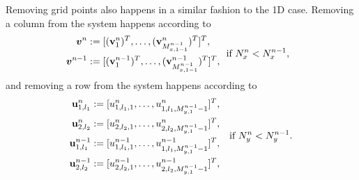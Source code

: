 \documentclass[fleqn]{jaes}
\begin{document}
Removing grid points also happens in a similar fashion to the 1D case. Removing a column from the system happens according to 
\begin{equation}
\begin{aligned}
    \!\!\!\!\vv^n &:= [(\v_1^n)^T, \hdots, (\v_{M_{x,1-1}^{n-1}}^n)^T]^T,\\
     \!\!\!\!\vv^{n-1} &:= [(\v_1^{n-1})^T, \hdots, (\v_{M_{x,1-1}^{n-1}}^{n-1})^T]^T,
    \end{aligned}
\ \ \text{if } N_x^n < N_x^{n-1},
\end{equation}
and removing a row from the system happens according to
\begin{equation}
    \begin{aligned}
        \u_{1,l_1}^n &:= [u_{1,l_1, 1}^n, \hdots, u_{1,l_1, M_{y,1}^{n-1}-1}^n]^T,\\
        \u_{2,l_2}^n &:= [u_{2,l_2, 1}^n,\hdots, u^n_{2,l_2, M_{y, 1}^{n-1}-1}]^T,\\
        \u_{1,l_1}^{n-1} &:= [u_{1,l_1, 1}^{n-1}, \hdots, u_{1,l_1, M_{y,1}^{n-1}-1}^{n-1}]^T,\\
        \u_{2,l_2}^{n-1} &:= [u_{2,l_2, 1}^{n-1},\hdots, u^{n-1}_{2,l_2, M_{y, 1}^{n-1}-1}]^T,
    \end{aligned}\quad \text{if } N_y^n < N_y^{n-1}.
\end{equation}
\end{document}
